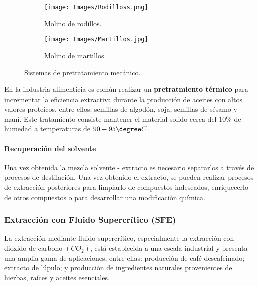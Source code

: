 \begin{figure}[h!]
	\centering
	\begin{subfigure}[b]{0.5\textwidth}
		\centering
		\texttt{[image: Images/Rodilloss.png]}
	\caption{Molino de rodillos.}
	\end{subfigure}
	\hfill
	\begin{subfigure}[b]{0.5\textwidth}
		\centering
		\texttt{[image: Images/Martillos.jpg]}
	\caption{Molino de martillos.}
	\end{subfigure}
	\caption{Sistemas de pretratamiento mec\'anico.}
	\label{pret}
\end{figure}

\noindent
\justify

En la industria alimenticia es com\'un realizar un \textbf{pretratmiento t\'ermico} para incrementar la eficiencia extractiva durante la producci\'on de aceites con altos valores proteicos, entre ellos: semillas de algod\'on, soja, semillas de s\'esamo y man\'i. Este tratamiento consiste mantener el material solido cerca del $10 \%$ de humedad a temperaturas de $90 - 95 \degree C$.

\paragraph{Recuperaci\'on del solvente}

\noindent
\justify

Una vez obtenida la mezcla solvente - extracto es necesario separarlos a trav\'es de procesos de destilaci\'on. Una vez obtenido el extracto, se pueden realizar procesos de extracci\'on posteriores para limpiarlo de compuestos indeseados, enriquecerlo de otros compuestos o para desarrollar una modificaci\'on qu\'imica.

\subsubsection{Extracci\'on con Fluido Supercr\'itico (SFE)}

\noindent
\justify

La extracci\'on mediante fluido supercr\'itico, especialmente la extracci\'on con dioxido de carbono $\left(CO_2 \right)$, est\'a establecida a una escala industrial y presenta una amplia gama de aplicaciones, entre ellas: producci\'on de caf\'e descafeinado; extracto de l\'upulo; y producci\'on de ingredientes naturales provenientes de hierbas, ra\'ices y aceites esenciales.

